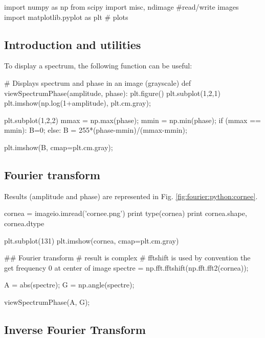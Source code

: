 \def\QRCODE{TB_image_TUT.IMG.cornea_fourier_pythonqrcode.png}
\def\QRPAGE{http://www.iptutorials.science/tree/master/TB_image/TUT.IMG.cornea_fourier/python}

\begin{python}
import numpy as np
from scipy import misc, ndimage #read/write images
import matplotlib.pyplot as plt # plots
\end{python}

\subsection{Introduction and utilities} To display a spectrum, the following function can be useful:
\begin{python}
# Displays spectrum and phase in an image (grayscale)
def viewSpectrumPhase(amplitude, phase):
    plt.figure()
    plt.subplot(1,2,1)
    plt.imshow(np.log(1+amplitude), plt.cm.gray);
    
    plt.subplot(1,2,2)
    mmax = np.max(phase);
    mmin = np.min(phase);
    if (mmax == mmin):
        B=0;
    else:
        B = 255*(phase-mmin)/(mmax-mmin);
        
    plt.imshow(B, cmap=plt.cm.gray);

\end{python}

\subsection{Fourier transform}
Results (amplitude and phase) are represented in Fig. \ref{fig:fourier:python:cornee}.

\begin{python}
cornea = imageio.imread('cornee.png')
print type(cornea)
print cornea.shape, cornea.dtype

plt.subplot(131)
plt.imshow(cornea, cmap=plt.cm.gray)
\end{python}

\begin{python}
## Fourier transform
#  result is complex
#  fftshift is used by convention the get frequency 0 at center of image
spectre = np.fft.fftshift(np.fft.fft2(cornea));

A = abs(spectre);
G = np.angle(spectre);

viewSpectrumPhase(A, G);
\end{python}


\subsection{Inverse Fourier Transform}

